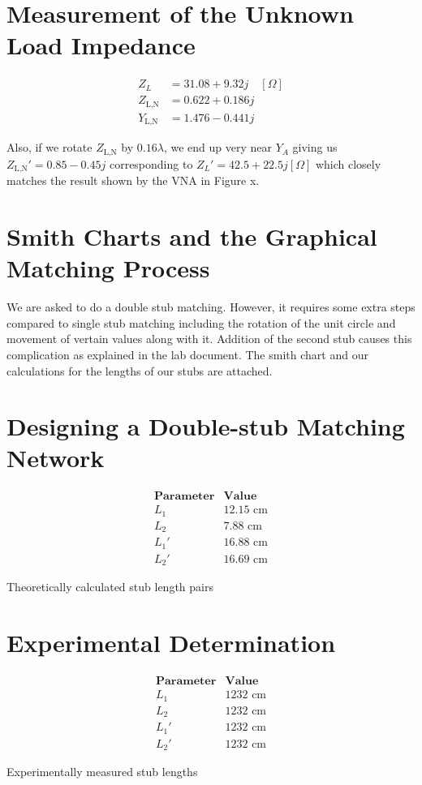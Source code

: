 \documentclass[10pt]{article}
\begin{document}
\section{Measurement of the Unknown Load Impedance}

\begin{align*}
  Z_L &= 31.08 + 9.32j \quad [\Omega]\\
  Z_\text{L,N} &= 0.622 + 0.186j\\
  Y_\text{L,N} &= 1.476 - 0.441j
\end{align*}

Also, if we rotate $Z_\text{L,N}$ by $0.16\lambda$, we end up very near $Y_A$ giving us $Z_\text{L,N}' = 0.85 - 0.45j$ 
corresponding to $Z_L' = 42.5 + 22.5j [\Omega]$ which closely matches the result shown by the VNA in Figure x. 

\section{Smith Charts and the Graphical Matching Process}

We are asked to do a double stub matching. However, it requires some extra steps compared to single stub matching
including the rotation of the unit circle and movement of vertain values along with it. Addition of the second stub
causes this complication as explained in the lab document. The smith chart and our calculations for the lengths of 
our stubs are attached.

\section{Designing a Double-stub Matching Network}
\begin{table}[h]
  \[
      \begin{array}{c|c}
          \textbf{Parameter} & \textbf{Value} \\ \hline
          L_1 & 12.15 \text{ cm}\\
          L_2 & 7.88 \text{ cm}\\
          L_1' & 16.88 \text{ cm}\\
          L_2' & 16.69 \text{ cm}
      \end{array}
  \]
  \caption{Theoretically calculated stub length pairs}
\end{table}

\section{Experimental Determination }
\begin{table}[h]
  \[
      \begin{array}{c|c}
          \textbf{Parameter} & \textbf{Value} \\ \hline
          L_1 & 1232 \text{ cm}\\
          L_2 & 1232 \text{ cm}\\
          L_1' & 1232 \text{ cm}\\
          L_2' & 1232 \text{ cm}
      \end{array}
  \]
  \caption{Experimentally measured stub lengths}
\end{table}
\end{document}
